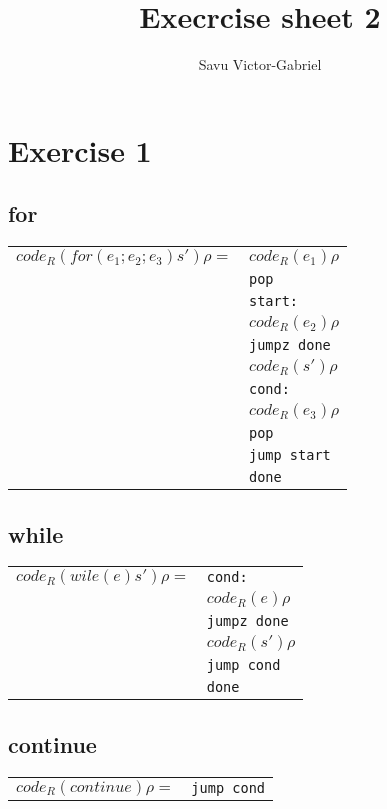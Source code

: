 \documentclass[10pt,a4paper]{article}
\title{Execrcise sheet 2}
\author{Savu Victor-Gabriel}
\begin{document}
	\maketitle
	
	\section{Exercise 1}
	
	\subsection{for}
	
	\begin{tabular}{l l}
		$code_R(for(e_1;e_2;e_3) s') \rho = $ & $code_R(e_1) \rho$ \\
		& \texttt{pop} \\
		& \texttt{start:} \\
		& $code_R(e_2) \rho$ \\
		& \texttt{jumpz done} \\
		& $code_R(s') \rho$ \\
		& \texttt{cond:} \\
		& $code_R(e_3) \rho$ \\
		& \texttt{pop} \\
		& \texttt{jump start} \\
		& \texttt{done} \\
	\end{tabular}
	
	\subsection{while}
	
	\begin{tabular}{l l}
		$code_R(wile(e) s') \rho = $ & \texttt{cond:} \\
		& $code_R(e) \rho$ \\
		& \texttt{jumpz done} \\
		& $code_R(s') \rho$ \\
		& \texttt{jump cond} \\
		& \texttt{done} \\
	\end{tabular}
	
	\subsection{continue}
	
	\begin{tabular}{l l}
		$code_R(continue) \rho = $ & \texttt{jump cond}
	\end{tabular}
	
\end{document}
